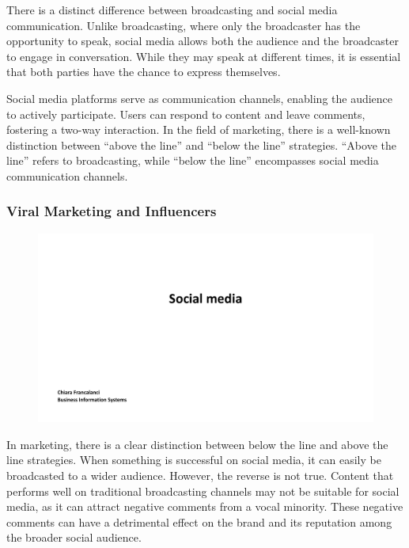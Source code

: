 There is a distinct difference between
broadcasting and social media communication. Unlike broadcasting, where
only the broadcaster has the opportunity to speak, social media allows
both the audience and the broadcaster to engage in conversation. While
they may speak at different times, it is essential that both parties
have the chance to express themselves.

Social media platforms serve as communication channels, enabling the
audience to actively participate. Users can respond to content and leave
comments, fostering a two-way interaction. In the field of marketing,
there is a well-known distinction between ``above the line'' and ``below
the line'' strategies. ``Above the line'' refers to broadcasting, while
``below the line'' encompasses social media communication channels.

\subsubsection{Viral Marketing and
    Influencers}\label{viral-marketing-and-influencers}

\begin{figure}[!h]
    \centering
    \includegraphics[page=19, trim = 2cm 7cm 3cm 4cm, clip, width=\textwidth]{images/04 - Social_Media.pdf}
\end{figure}

In marketing, there is a clear distinction between below
the line and above the line strategies. When something is successful on
social media, it can easily be broadcasted to a wider audience. However,
the reverse is not true. Content that performs well on traditional
broadcasting channels may not be suitable for social media, as it can
attract negative comments from a vocal minority. These negative comments
can have a detrimental effect on the brand and its reputation among the
broader social audience.

